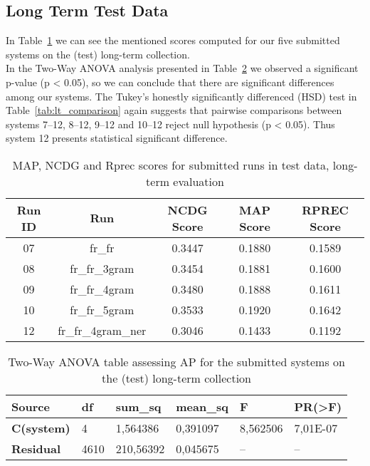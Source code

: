 \subsection{Long Term Test Data}\label{subsec:long_term}

In Table~\ref{tab:lt_scores} we can see the mentioned scores computed for our five submitted systems on the (test)
long-term collection.\\

In the Two-Way ANOVA analysis presented in Table~\ref{tab:lt_anova} we observed a significant p-value (p < 0.05), so we
can conclude that there are significant differences among our systems.
The Tukey's honestly significantly differenced (HSD) test in Table~\ref{tab:lt_comparison} again suggests that pairwise
comparisons between systems 7--12, 8--12, 9--12 and 10--12 reject null hypothesis (p < 0.05).
Thus system 12 presents statistical significant difference.

\begin{table}[h!]
    \begin{center}
        \caption{MAP, NCDG and Rprec scores for submitted runs in test data, long-term evaluation}
        \label{tab:lt_scores}
        \begin{tabular}{|c|c||c|c|c|}
            \hline
            \textbf{Run ID} & \textbf{Run} & \textbf{NCDG Score} & \textbf{MAP Score} & \textbf{RPREC Score}\\
            \hline\hline
            07 & fr\_fr & 0.3447 & 0.1880 & 0.1589 \\
            \hline
            08 & fr\_fr\_3gram & 0.3454 & 0.1881 & 0.1600 \\
            \hline
            09 & fr\_fr\_4gram & 0.3480 & 0.1888 & 0.1611 \\
            \hline
            10 & fr\_fr\_5gram & 0.3533 & 0.1920 & 0.1642 \\
            \hline
            12 & fr\_fr\_4gram\_ner & 0.3046 & 0.1433 & 0.1192\\
            \hline
        \end{tabular}
    \end{center}
\end{table}

\begin{table}[!ht]
    \centering
    \caption{Two-Way ANOVA table assessing AP for the submitted systems on the (test) long-term collection}
    \label{tab:lt_anova}
    \begin{tabular}{|l|l|l|l|l|l|}
    \hline
        \textbf{Source} & \textbf{df} & \textbf{sum\_sq} & \textbf{mean\_sq} & \textbf{F} & \textbf{PR(>F)} \\ \hline\hline
        \textbf{C(system)} & 4 & 1,564386 & 0,391097 & 8,562506 & 7,01E-07 \\ \hline
        \textbf{Residual} & 4610 & 210,56392 & 0,045675 & -- & -- \\ \hline
    \end{tabular}
\end{table}

